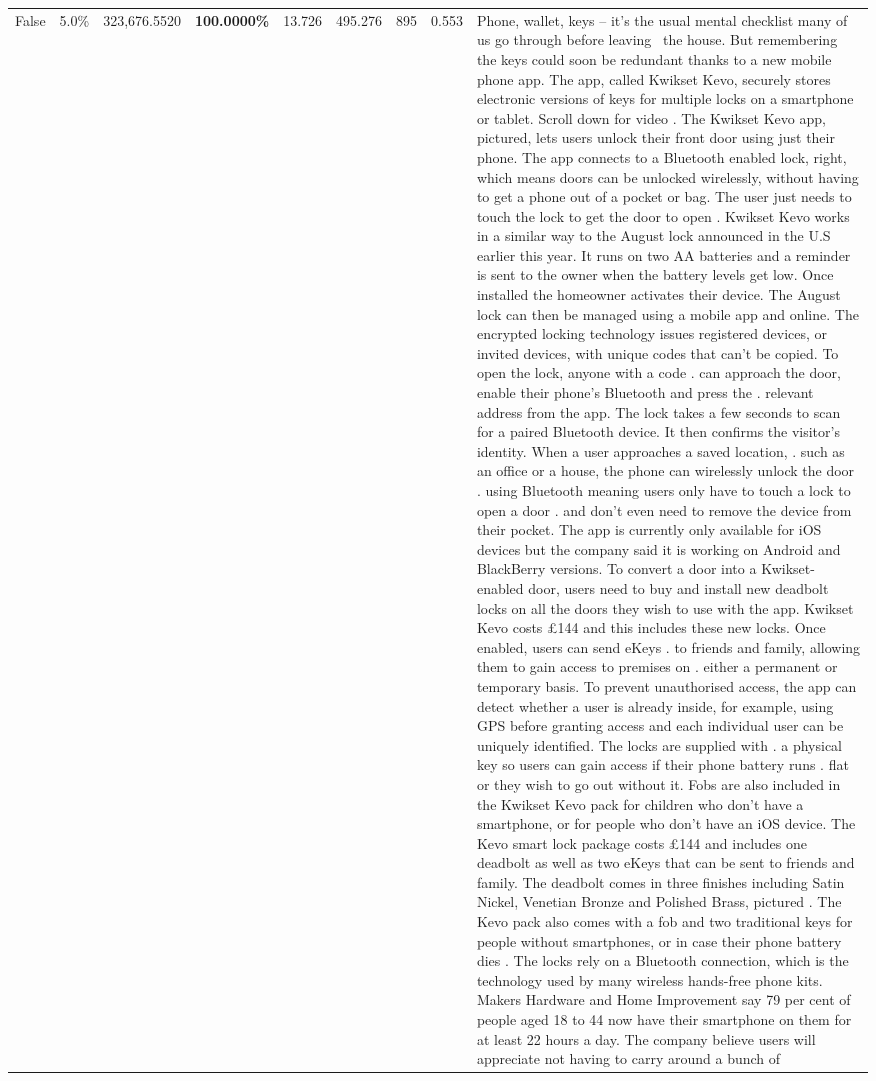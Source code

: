 \begin{table}[H]
\begin{tabular}{lllrlllll}
False & 5.0\% & 323,676.5520 & \bfseries \color{red} 100.0000\% & 13.726 & 495.276 & 895 & 0.553 & Phone, wallet, keys – it’s the usual mental checklist many of us go through before leaving  the house. But remembering the keys could soon be redundant thanks to a new mobile phone app. The app, called Kwikset Kevo, securely stores electronic versions of keys for multiple locks on a smartphone or tablet. Scroll down for video . The Kwikset Kevo app, pictured, lets users unlock their front door using just their phone. The app connects to a Bluetooth enabled lock, right, which means doors can be unlocked wirelessly, without having to get a phone out of a pocket or bag. The user just needs to touch the lock to get the door to open . Kwikset Kevo works in a similar way to the August lock announced in the U.S earlier this year. It runs on two AA batteries and a reminder is sent to the owner when the battery levels get low. Once installed the homeowner activates their device. The August lock can then be managed using a mobile app and online. The encrypted locking technology issues registered devices, or invited devices, with unique codes that can't be copied. To open the lock, anyone with a code . can approach the door, enable their phone's Bluetooth and press the . relevant address from the app. The lock takes a few seconds to scan for a paired Bluetooth device. It then confirms the visitor's identity. When a user approaches a saved location, . such as an office or a house, the phone can wirelessly unlock the door . using Bluetooth meaning users only have to touch a lock to open a door . and don't even need to remove the device from their pocket. The app is currently only available for iOS devices but the company said it is working on Android and BlackBerry versions. To convert a door into a Kwikset-enabled door, users need to buy and install new deadbolt locks on all the doors they wish to use with the app. Kwikset Kevo costs £144 and this includes these new locks. Once enabled, users can send eKeys . to friends and family, allowing them to gain access to premises on . either a permanent or temporary basis. To prevent unauthorised access, the app can detect whether a user is already inside, for example, using GPS before granting access and each individual user can be uniquely identified. The locks are supplied with . a physical key so users can gain access if their phone battery runs . flat or they wish to go out without it. Fobs are also included in the Kwikset Kevo pack for children who don't have a smartphone, or for people who don't have an iOS device. The Kevo smart lock package costs £144 and includes one deadbolt as well as two eKeys that can be sent to friends and family. The deadbolt comes in three finishes including Satin Nickel, Venetian Bronze and Polished Brass, pictured . The Kevo pack also comes with a fob and two traditional keys for people without smartphones, or in case their phone battery dies . The locks rely on a Bluetooth connection, which is the technology used by many wireless hands-free phone kits. Makers Hardware and Home Improvement say 79 per cent of people aged 18 to 44 now have their smartphone on them for at least 22 hours a day. The company believe users will appreciate not having to carry around a bunch of 
\end{tabular}
\end{table}
